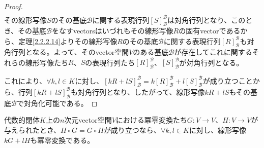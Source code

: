 \documentclass[dvipdfmx]{jsarticle}
\begin{document}
\begin{proof}
\begin{align*}
\end{align*}
その線形写像$S$のその基底$\mathcal{B}$に関する表現行列$[S]_{\mathcal{B}}^{\mathcal{B}}$は対角行列となり、このとき、その基底$\mathcal{B}$をなすvectorsはいづれもその線形写像$R$の固有vectorであるから、定理\ref{2.2.2.14}よりその線形写像$R$のその基底$\mathcal{B}$に関する表現行列$[R]_{\mathcal{B}}^{\mathcal{B}}$も対角行列となる。よって、そのvector空間$V$のある基底$\mathcal{B}$が存在してこれに関するそれらの線形写像たち$R$、$S$の表現行列たち$[R]_{\mathcal{B}}^{\mathcal{B}}$、$[S]_{\mathcal{B}}^{\mathcal{B}}$が対角行列となる。\par
これにより、$\forall k,l \in K$に対し、$[kR + lS]_{\mathcal{B}}^{\mathcal{B}} = k[R]_{\mathcal{B}}^{\mathcal{B}} + l[S]_{\mathcal{B}}^{\mathcal{B}}$が成り立つことから、行列$[kR + lS]_{\mathcal{B}}^{\mathcal{B}}$も対角行列となり、したがって、線形写像$kR + lS$もその基底$\mathcal{B}$で対角化可能である。
\end{proof}
\begin{thm}\label{2.2.7.4}
代数的閉体$K$上の$n$次元vector空間$V$における冪零変換たち$G:V \rightarrow V$、$H:V \rightarrow V$が与えられたとき、$H \circ G = G \circ H$が成り立つなら、$\forall k,l \in K$に対し、線形写像$kG + lH$も冪零変換である。
\end{thm}
\end{document}
